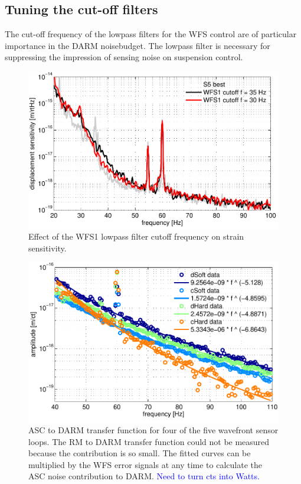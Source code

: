 \subsection{Tuning the cut-off filters} 
The cut-off frequency of the lowpass filters for the WFS control are
of particular importance in the DARM noisebudget. The lowpass filter
is necessary for suppressing the impression of sensing noise on
suspension control. 

\begin{figure}
\begin{centering}
\includegraphics[width=1.0\textwidth]{figures/cutoffWFS1_DARMcompare.pdf}
\caption[Effect of the WFS1 lowpass filter cutoff frequency on strain
sensitivity.]{Effect of the WFS1 lowpass filter cutoff frequency on
  strain sensitivity.}
\label{fig:WFS1cutoff}
\end{centering}
\end{figure}




\begin{figure}
\begin{centering}
\includegraphics[width=1.0\columnwidth]{figures/ASC2DARM_TFs.pdf}
\caption[Measured ASC to DARM transfer functions]{ASC to DARM transfer
  function for four of the five wavefront sensor loops. The RM to DARM
  transfer function could not be measured because the contribution is
  so small. The fitted curves can be multiplied by the WFS error
  signals at any time to calculate the ASC noise contribution to
  DARM. \textcolor{blue}{Need to turn cts into Watts.}}
\end{centering}
\end{figure}



